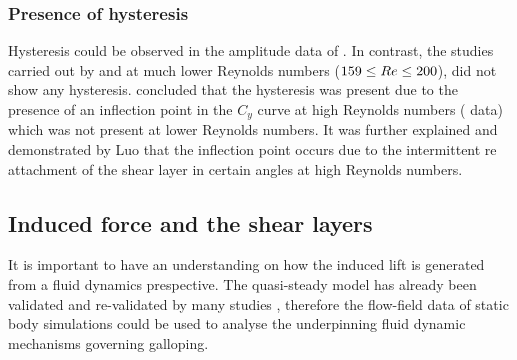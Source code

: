 \subsubsection*{Presence of hysteresis}

Hysteresis could be observed in the amplitude data of \cite{Parkinson1964}. In contrast, the studies carried out by \citet{Barrero-Gil2009} and \citet{Joly2012} at much lower Reynolds numbers ($159\leq Re\leq 200$), did not show any hysteresis. \citet{Luo2003} concluded that the hysteresis was present due to the presence of an inflection point in the $C_y$ curve at high Reynolds numbers (\citet{Parkinson1964} data) which was not present at lower Reynolds numbers. It was further explained and demonstrated by Luo that the inflection point occurs due to the intermittent re attachment of the shear layer in certain angles at high Reynolds numbers. 





\subsection{Induced force and the shear layers}
\label{subsec:c_y and shear layers}

It is important to have an understanding on how the induced lift is generated from a fluid dynamics prespective. The quasi-steady model has already been validated and re-validated by many studies , therefore the flow-field data of static body simulations could be used to analyse the underpinning fluid dynamic mechanisms governing galloping.




